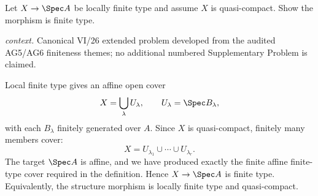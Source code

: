 \begin{problem}\label{prob:vi26-p19}
Let \(X\to\Spec A\) be locally finite type and assume \(X\) is quasi-compact.  Show the morphism is finite type.
\par\smallskip\noindent\textit{context.} Canonical VI/26 extended problem developed from the audited AG5/AG6 finiteness themes; no additional numbered Supplementary Problem is claimed.
\end{problem}

\ifdefined\FullProblemDossiers
\begin{solution}
Local finite type gives an affine open cover
\[
X=\bigcup_\lambda U_\lambda,\qquad U_\lambda=\Spec B_\lambda,
\]
with each \(B_\lambda\) finitely generated over \(A\).  Since \(X\) is quasi-compact, finitely many
members cover:
\[
X=U_{\lambda_1}\cup\cdots\cup U_{\lambda_r}.
\]
The target \(\Spec A\) is affine, and we have produced exactly the finite affine finite-type cover
required in the definition.  Hence \(X\to\Spec A\) is finite type.  Equivalently, the structure
morphism is locally finite type and quasi-compact.
\end{solution}
\fi
